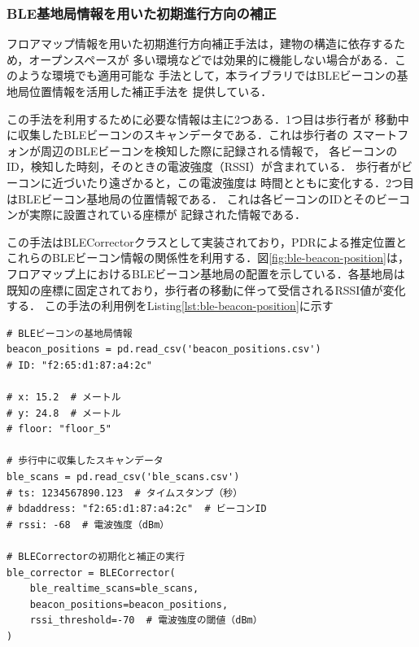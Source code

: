 

\subsubsection{BLE基地局情報を用いた初期進行方向の補正}




フロアマップ情報を用いた初期進行方向補正手法は，建物の構造に依存するため，オープンスペースが
多い環境などでは効果的に機能しない場合がある．このような環境でも適用可能な
手法として，本ライブラリではBLEビーコンの基地局位置情報を活用した補正手法を
提供している．

この手法を利用するために必要な情報は主に2つある．1つ目は歩行者が
移動中に収集したBLEビーコンのスキャンデータである．これは歩行者の
スマートフォンが周辺のBLEビーコンを検知した際に記録される情報で，
各ビーコンのID，検知した時刻，そのときの電波強度（RSSI）が含まれている．
歩行者がビーコンに近づいたり遠ざかると，この電波強度は
時間とともに変化する．2つ目はBLEビーコン基地局の位置情報である．
これは各ビーコンのIDとそのビーコンが実際に設置されている座標が
記録された情報である．

この手法はBLECorrectorクラスとして実装されており，PDRによる推定位置と
これらのBLEビーコン情報の関係性を利用する．図\ref{fig:ble-beacon-position}は，
フロアマップ上におけるBLEビーコン基地局の配置を示している．各基地局は
既知の座標に固定されており，歩行者の移動に伴って受信されるRSSI値が変化する．
この手法の利用例をListing\ref{lst:ble-beacon-position}に示す

\begin{lstlisting}[caption={BLECorrectorの使用例},label=lst:ble-beacon-position,float=h]
# BLEビーコンの基地局情報
beacon_positions = pd.read_csv('beacon_positions.csv')
# ID: "f2:65:d1:87:a4:2c"

# x: 15.2  # メートル
# y: 24.8  # メートル
# floor: "floor_5"

# 歩行中に収集したスキャンデータ
ble_scans = pd.read_csv('ble_scans.csv')
# ts: 1234567890.123  # タイムスタンプ（秒）
# bdaddress: "f2:65:d1:87:a4:2c"  # ビーコンID
# rssi: -68  # 電波強度（dBm）

# BLECorrectorの初期化と補正の実行
ble_corrector = BLECorrector(
    ble_realtime_scans=ble_scans,
    beacon_positions=beacon_positions,
    rssi_threshold=-70  # 電波強度の閾値（dBm）
)
\end{lstlisting}




